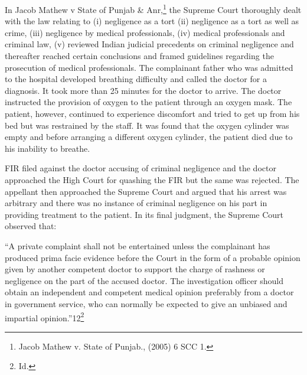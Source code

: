 \begin{multicols}{2}
\vspace{-.15cm}


\vspace{-.1cm}

\noi
In Jacob Mathew v State of Punjab \& Anr,\footnote{ Jacob Mathew v. State of Punjab., (2005) 6 SCC 1.} the Supreme Court thoroughly dealt with the law relating to (i) negligence as a tort (ii) negligence as a tort as well as crime, (iii) negligence by
medical professionals, (iv) medical professionals and criminal law, (v) reviewed Indian judicial
precedents on criminal negligence and thereafter reached certain conclusions and framed
guidelines regarding the prosecution of medical professionals. The complainant father who was
admitted to the hospital developed breathing difficulty and called the doctor for a diagnosis. It
took more than 25 minutes for the doctor to arrive. The doctor instructed the provision of oxygen
to the patient through an oxygen mask. The patient, however, continued to experience discomfort
and tried to get up from his bed but was restrained by the staff. It was found that the oxygen
cylinder was empty and before arranging a different oxygen cylinder, the patient died due to his
inability to breathe.

\vspace{-.1cm}

\noi
FIR filed against the doctor accusing of criminal negligence and the doctor approached the High
Court for quashing the FIR but the same was rejected. The appellant then approached the Supreme
Court and argued that his arrest was arbitrary and there was no instance of criminal negligence
on his part in providing treatment to the patient. In its final judgment, the Supreme Court observed
that:

\vspace{-.1cm}

\noi
“A private complaint shall not be entertained unless the complainant has produced prima facie
evidence before the Court in the form of a probable opinion given by another competent doctor
to support the charge of rashness or negligence on the part of the accused doctor. The investigation
officer should obtain an independent and competent medical opinion preferably from a doctor in
government service, who can normally be expected to give an unbiased and impartial opinion.”12\footnote{Id.}

\vspace{-.1cm}


\end{multicols}
